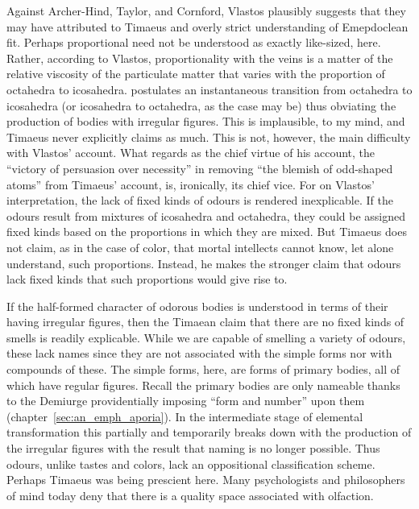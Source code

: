 Against Archer-Hind, Taylor, and Cornford, Vlastos plausibly suggests that they may have attributed to Timaeus and overly strict understanding of Emepdoclean fit. Perhaps proportional need not be understood as exactly like-sized, here. Rather, according to Vlastos, proportionality with the veins is a matter of the relative viscosity of the particulate matter that varies with the proportion of octahedra to icosahedra. \citet[206-7]{Vlastos:1967jw} postulates an instantaneous transition from octahedra to icosahedra (or icosahedra to octahedra, as the case may be) thus obviating the production of bodies with irregular figures. This is implausible, to my mind, and Timaeus never explicitly claims as much. This is not, however, the main difficulty with Vlastos' account. What \citet[204 n, 209]{Vlastos:1967jw} regards as the chief virtue of his account, the ``victory of persuasion over necessity'' in removing ``the blemish of odd-shaped atoms'' from Timaeus' account, is, ironically, its chief vice. For on Vlastos' interpretation, the lack of fixed kinds of odours is rendered inexplicable. If the odours result from mixtures of icosahedra and octahedra, they could be assigned fixed kinds based on the proportions in which they are mixed. But Timaeus does not claim, as in the case of color, that mortal intellects cannot know, let alone understand, such proportions. Instead, he makes the stronger claim that odours lack fixed kinds that such proportions would give rise to.

If the half-formed character of odorous bodies is understood in terms of their having irregular figures, then the Timaean claim that there are no fixed kinds of smells is readily explicable. While we are capable of smelling a variety of odours, these lack names since they are not associated with the simple forms nor with compounds of these. The simple forms, here, are forms of primary bodies, all of which have regular figures. Recall the primary bodies are only nameable thanks to the Demiurge providentially imposing ``form and number'' upon them (chapter~\ref{sec:an_emph_aporia}). In the intermediate stage of elemental transformation this partially and temporarily breaks down with the production of the irregular figures with the result that naming is no longer possible. Thus odours, unlike tastes and colors, lack an oppositional classification scheme. Perhaps Timaeus was being prescient here. Many psychologists and philosophers of mind today deny that there is a quality space associated with olfaction.

